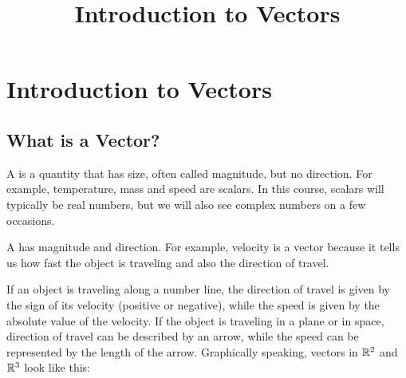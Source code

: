 \documentclass{ximera}
\title{Introduction to Vectors} \license{CC BY-NC-SA 4.0}
\begin{document}
\begin{abstract}

\end{abstract}
\maketitle


\section*{Introduction to Vectors}

\subsection*{What is a Vector?}

A  is a quantity that has size, often called  magnitude, but no direction.  For example, temperature, mass and speed are scalars.  In this course, scalars will typically be real numbers, but we will also see complex numbers on a few occasions.  

A  has magnitude and direction.  For example, velocity is a vector because it tells us how fast the object is traveling and also the direction of travel.  

If an object is traveling along a number line, the direction of travel is given by the sign of its velocity (positive or negative), while the speed is given by the absolute value of the velocity.  If the object is traveling in a plane or in space, direction of travel can be described by an arrow, while the speed can be represented by the length of the arrow.  Graphically speaking, vectors in $\mathbb{R}^2$ and $\mathbb{R}^3$ look like this: 

\begin{center}
\end{center}
\end{document}
